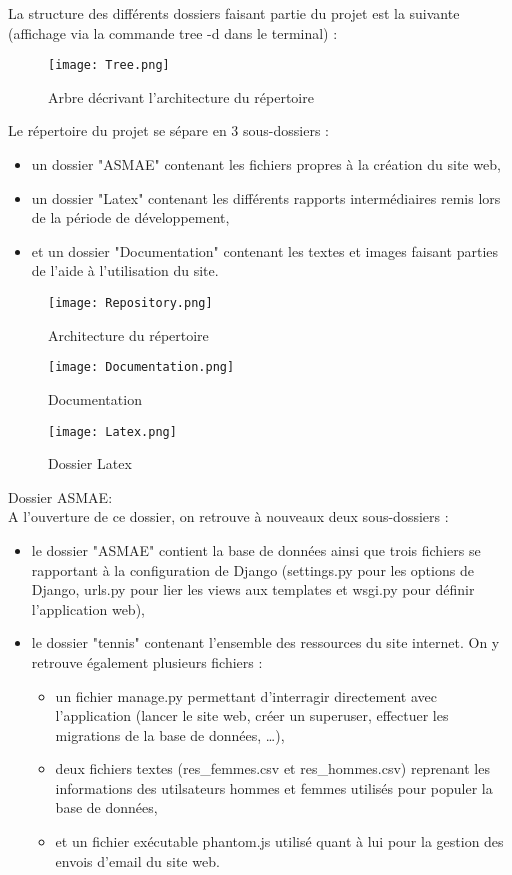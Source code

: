 La structure des différents dossiers faisant partie du projet est la suivante (affichage via la commande tree -d dans le terminal) :

\begin{figure}[H]
\centering
\texttt{[image: Tree.png]}
\caption{Arbre décrivant l'architecture du répertoire}
\end{figure}

Le répertoire du projet se sépare en 3 sous-dossiers :

\begin{itemize}
\item un dossier "ASMAE" contenant les fichiers propres à la création du site web,
\item un dossier "Latex" contenant les différents rapports intermédiaires remis lors de la période de développement,
\item et un dossier "Documentation" contenant les textes et images faisant parties de l'aide à l'utilisation du site.
\end{itemize}

\begin{figure}[H]
\centering
\texttt{[image: Repository.png]}
\caption{Architecture du répertoire}
\end{figure}

\begin{figure}[H]
\centering
\texttt{[image: Documentation.png]}
\caption{Documentation}
\end{figure}

\begin{figure}[H]
\centering
\texttt{[image: Latex.png]}
\caption{Dossier Latex}
\end{figure}

Dossier ASMAE:\\

A l'ouverture de ce dossier, on retrouve à nouveaux deux sous-dossiers :\\

\begin{itemize}
	\item le dossier "ASMAE" contient  la base de données ainsi que trois fichiers se rapportant à la configuration de Django (settings.py pour les options de Django, urls.py pour lier les views aux templates et wsgi.py pour définir l'application web), 
	\item le dossier "tennis" contenant l'ensemble des ressources du site internet. On y retrouve également plusieurs fichiers :
	\begin{itemize}
		\item un fichier manage.py permettant d'interragir directement avec l'application (lancer le site web, créer un superuser, effectuer les migrations de la base de données, …), 
		\item deux fichiers textes (res\_femmes.csv et res\_hommes.csv) reprenant les informations des utilsateurs hommes et femmes utilisés pour populer la base de données, 
		\item et un fichier exécutable phantom.js utilisé quant à lui pour la gestion des envois d'email du site web.
	\end{itemize}
\end{itemize}

